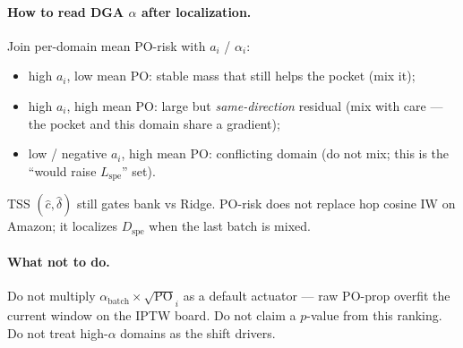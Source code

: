 \paragraph{How to read DGA $\alpha$ after localization.}
Join per-domain mean PO-risk with $a_i$ / $\alpha_i$:
\begin{itemize}
  \item high $a_i$, low mean PO: stable mass that still helps the pocket
        (mix it);
  \item high $a_i$, high mean PO: large but \emph{same-direction} residual
        (mix with care --- the pocket and this domain share a gradient);
  \item low / negative $a_i$, high mean PO: conflicting domain
        (do not mix; this is the ``would raise $L_{\mathrm{spe}}$'' set).
\end{itemize}
TSS $(\hat c,\hat\delta)$ still gates bank vs Ridge.
PO-risk does not replace hop cosine IW on Amazon; it localizes $D_{\mathrm{spe}}$
when the last batch is mixed.

\paragraph{What not to do.}
Do not multiply $\alpha_{\mathrm{batch}}\times\sqrt{\mathrm{PO}}_i$ as a default
actuator --- raw PO-prop overfit the current window on the IPTW board.
Do not claim a $p$-value from this ranking.
Do not treat high-$\alpha$ domains as the shift drivers.
